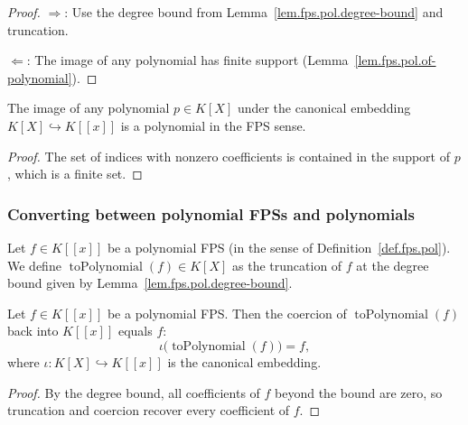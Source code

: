\begin{proof}
\leanok
$\Longrightarrow$: Use the degree bound from
Lemma~\ref{lem.fps.pol.degree-bound} and truncation.

$\Longleftarrow$: The image of any polynomial has finite support
(Lemma~\ref{lem.fps.pol.of-polynomial}).
\end{proof}

\begin{lemma}
\label{lem.fps.pol.of-polynomial}
\leanhelper
\leanok
The image of any polynomial $p\in K[X]$ under the canonical embedding
$K[X]\hookrightarrow K\left[\left[x\right]\right]$ is a polynomial in the FPS
sense.
\end{lemma}

\begin{proof}
\leanok
The set of indices with nonzero coefficients is contained in the support of $p$,
which is a finite set.
\end{proof}

\subsubsection{Converting between polynomial FPSs and polynomials}

\begin{definition}
\label{def.fps.pol.toPolynomial}
\leanhelper
\leanok
Let $f\in K\left[\left[x\right]\right]$ be a polynomial FPS (in the sense of
Definition~\ref{def.fps.pol}). We define $\operatorname{toPolynomial}(f)\in K[X]$ as
the truncation of $f$ at the degree bound given by
Lemma~\ref{lem.fps.pol.degree-bound}.
\end{definition}

\begin{lemma}
\label{lem.fps.pol.coe-toPolynomial}
\leanhelper
\leanok
Let $f\in K\left[\left[x\right]\right]$ be a polynomial FPS. Then the
coercion of $\operatorname{toPolynomial}(f)$ back into
$K\left[\left[x\right]\right]$ equals $f$:
\[
\iota\bigl(\operatorname{toPolynomial}(f)\bigr) = f,
\]
where $\iota\colon K[X]\hookrightarrow K\left[\left[x\right]\right]$ is the
canonical embedding.
\end{lemma}

\begin{proof}
By the degree bound, all coefficients of $f$ beyond the bound are zero, so
truncation and coercion recover every coefficient of $f$.
\end{proof}

